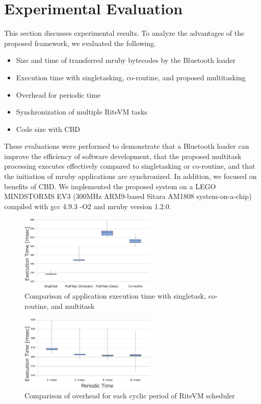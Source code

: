 \documentclass[S,R,E]{article/compsoft}
\begin{document}
\section{Experimental Evaluation}
\label{sec:Evaluation}
This section discusses experimental results.
To analyze the advantages of the proposed framework, we evaluated the following.
\begin{itemize}
    \item Size and time of transferred mruby bytecodes by the Bluetooth loader
    \item Execution time with singletasking, co-routine, and proposed multitasking
    \item Overhead for periodic time
    \item Synchronization of multiple RiteVM tasks
    \item Code size with CBD 
\end{itemize}

These evaluations were performed to demonstrate that a Bluetooth loader can improve the efficiency of software development, that the proposed multitask processing executes effectively compared to singletasking or co-routine, and that the initiation of mruby applications are synchronized.
In addition, we focused on benefits of CBD.
We implemented the proposed system on a LEGO MINDSTORMS EV3 \cite{par:EV3} (300MHz ARM9-based Sitara AM1808 system-on-a-chip) compiled with gcc 4.9.3 -O2 and mruby version 1.2.0.

\begin{figure}[t]
    \centering
    \includegraphics[width=6.5cm,clip]{figure/comparison_s_c_m.eps}
\caption{Comparison of application execution time with singletask, co-routine, and multitask}
\label{fig:comparison_s_c_m}
\end{figure}
\begin{figure}[t]
    \centering
    \includegraphics[width=6.5cm,clip]{figure/comparison_msec.eps}
\caption{Comparison of overhead for each cyclic period of RiteVM scheduler}
\label{fig:comparison_msec}
\end{figure}
\end{document}
